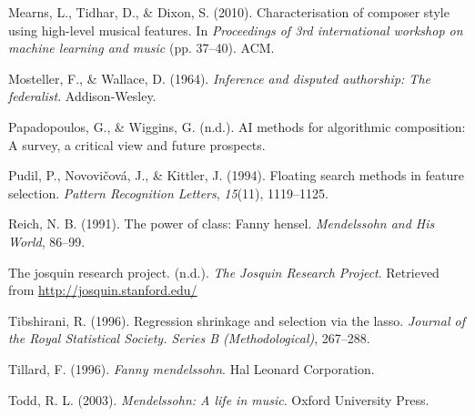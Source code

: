 \documentclass[12pt,twoside]{reedthesis}
\theoremstyle{definition}
\theoremstyle{definition}
\theoremstyle{definition}
\theoremstyle{remark}
\begin{document}
\hypertarget{ref-mearns2010}{}
Mearns, L., Tidhar, D., \& Dixon, S. (2010). Characterisation of
composer style using high-level musical features. In \emph{Proceedings
of 3rd international workshop on machine learning and music} (pp.
37--40). ACM.

\hypertarget{ref-mosteller1964inference}{}
Mosteller, F., \& Wallace, D. (1964). \emph{Inference and disputed
authorship: The federalist}. Addison-Wesley.

\hypertarget{ref-papadopoulosai}{}
Papadopoulos, G., \& Wiggins, G. (n.d.). AI methods for algorithmic
composition: A survey, a critical view and future prospects.

\hypertarget{ref-pudil1994floating}{}
Pudil, P., Novovičová, J., \& Kittler, J. (1994). Floating search
methods in feature selection. \emph{Pattern Recognition Letters},
\emph{15}(11), 1119--1125.

\hypertarget{ref-reich1991}{}
Reich, N. B. (1991). The power of class: Fanny hensel. \emph{Mendelssohn
and His World}, 86--99.

\hypertarget{ref-jrp}{}
The josquin research project. (n.d.). \emph{The Josquin Research
Project}. Retrieved from \url{http://josquin.stanford.edu/}

\hypertarget{ref-lasso}{}
Tibshirani, R. (1996). Regression shrinkage and selection via the lasso.
\emph{Journal of the Royal Statistical Society. Series B
(Methodological)}, 267--288.

\hypertarget{ref-tillard1996}{}
Tillard, F. (1996). \emph{Fanny mendelssohn}. Hal Leonard Corporation.

\hypertarget{ref-todd2003}{}
Todd, R. L. (2003). \emph{Mendelssohn: A life in music}. Oxford
University Press.


\end{document}
